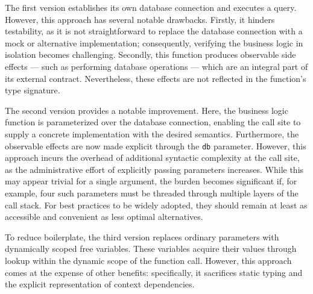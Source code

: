 \documentclass[acmsmall]{acmart}
\begin{document}
The first version establishes its own database connection and executes a query.
However, this approach has several notable drawbacks.
Firstly, it hinders testability, as it is not straightforward to replace the database connection with a mock or alternative implementation; consequently, verifying the business logic in isolation becomes challenging.
Secondly, this function produces observable side effects --- such as performing database operations --- which are an integral part of its external contract.
Nevertheless, these effects are not reflected in the function’s type signature.

The second version provides a notable improvement.
Here, the business logic function is parameterized over the database connection, enabling the call site to supply a concrete implementation with the desired semantics.
Furthermore, the observable effects are now made explicit through the \texttt{db} parameter.
However, this approach incurs the overhead of additional syntactic complexity at the call site, as the administrative effort of explicitly passing parameters increases.
While this may appear trivial for a single argument, the burden becomes significant if, for example, four such parameters must be threaded through multiple layers of the call stack.
For best practices to be widely adopted, they should remain at least as accessible and convenient as less optimal alternatives.

To reduce boilerplate, the third version replaces ordinary parameters with dynamically scoped free variables.
These variables acquire their values through lookup within the dynamic scope of the function call.
However, this approach comes at the expense of other benefits: specifically, it sacrifices static typing and the explicit representation of context dependencies.
\end{document}
